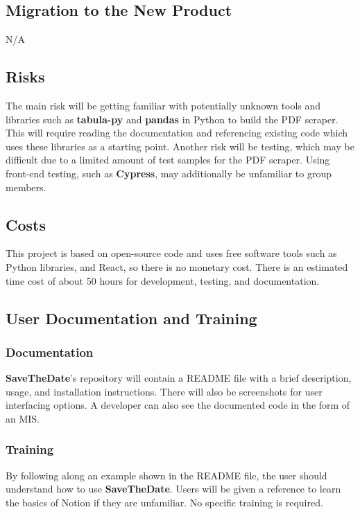 \documentclass[12pt, titlepage]{article}
\begin{document}
\subsection{Migration to the New Product}
N/A

\subsection{Risks}
The main risk will be getting familiar with potentially unknown tools and libraries such as \textbf{tabula-py} and \textbf{pandas} in Python to build the PDF scraper. This will require reading the documentation and referencing existing code which uses these libraries as a starting point. Another risk will be testing, which may be difficult due to a limited amount of test samples for  the PDF scraper. Using front-end testing, such as \textbf{Cypress}, may additionally be unfamiliar to group members.

\subsection{Costs}
This project is based on open-source code and uses free software tools such as Python libraries, and React, so there is no monetary cost. There is an estimated time cost of about 50 hours for development, testing, and documentation.

\subsection{User Documentation and Training}

\subsubsection{Documentation}
\textbf{SaveTheDate}’s repository will contain a README file with a brief description, usage, and installation instructions. There will also be screenshots for user interfacing options. A developer can also see the documented code in the form of an MIS.

\subsubsection{Training}
By following along an example shown in the README file, the user should understand how to use \textbf{SaveTheDate}. Users will be given a reference to learn the basics of Notion if they are unfamiliar. No specific training is required.
\end{document}
